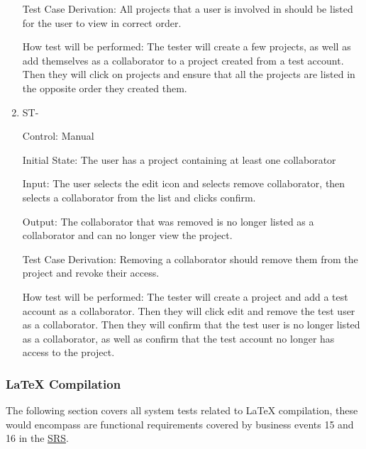 \documentclass[12pt, titlepage]{article}
\newcounter{TESTID}
\newcommand\TESTNUM{\stepcounter{TESTID}\theTESTID}
\begin{document}
\begin{enumerate}
		Test Case Derivation: All projects that a user is involved in should be listed for the user to view in correct order.
		
		How test will be performed: The tester will create a few projects, as well as add themselves as a collaborator to a project created from a test account. Then they will click on projects and ensure that all the projects are listed in the opposite order they created them.
		
		\item{ST-\TESTNUM\\}
		
		Control: Manual
		
		Initial State: The user has a project containing at least one collaborator
		
		Input: The user selects the edit icon and selects remove collaborator, then selects a collaborator from the list and clicks confirm. 
		
		Output: The collaborator that was removed is no longer listed as a collaborator and can no longer view the project.
		
		Test Case Derivation: Removing a collaborator should remove them from the project and revoke their access.
		
		How test will be performed: The tester will create a project and add a test account as a collaborator. Then they will click edit and remove the test user as a collaborator. Then they will confirm that the test user is no longer listed as a collaborator, as well as confirm that the test account no longer has access to the project.
		
		
	\end{enumerate}
	
	\subsubsection{LaTeX Compilation}
	
	The following section covers all system tests related to LaTeX compilation, these would encompass are functional requirements covered by business events 15 and 16 in the \href{https://github.com/RutheniumVI/UnderTree/blob/main/docs/SRS/SRS.pdf}{SRS}.
	
\end{document}
